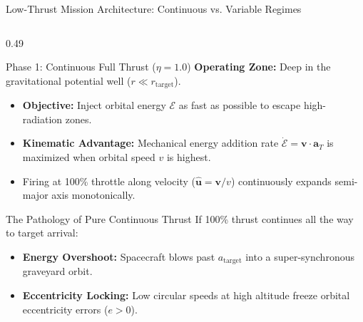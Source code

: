 \documentclass[aspectratio=169, 10pt]{beamer}
\begin{document}
\begin{frame}{Low-Thrust Mission Architecture: Continuous vs. Variable Regimes}
    \begin{columns}[T]
        \begin{column}{0.49\textwidth}
            \begin{block}{Phase 1: Continuous Full Thrust ($\eta = 1.0$)}
                \scriptsize
                \textbf{Operating Zone:} Deep in the gravitational potential well ($r \ll r_{\text{target}}$).
                \begin{itemize}\setlength{\itemsep}{1.5pt}\setlength{\topsep}{1pt}
                    \item \textbf{Objective:} Inject orbital energy $\mathcal{E}$ as fast as possible to escape high-radiation zones.
                    \item \textbf{Kinematic Advantage:} Mechanical energy addition rate $\dot{\mathcal{E}} = \mathbf{v} \cdot \mathbf{a}_T$ is maximized when orbital speed $v$ is highest.
                    \item Firing at 100\% throttle along velocity ($\hat{\mathbf{u}} = \mathbf{v}/v$) continuously expands semi-major axis monotonically.
                \end{itemize}
            \end{block}
            \vspace{-0.15cm}
            \begin{alertblock}{The Pathology of Pure Continuous Thrust}
                \scriptsize
                If 100\% thrust continues all the way to target arrival:
                \begin{itemize}\setlength{\itemsep}{1pt}\setlength{\topsep}{0pt}
                    \item \textbf{Energy Overshoot:} Spacecraft blows past $a_{\text{target}}$ into a super-synchronous graveyard orbit.
                    \item \textbf{Eccentricity Locking:} Low circular speeds at high altitude freeze orbital eccentricity errors ($e > 0$).
                \end{itemize}
            \end{alertblock}
        \end{column}


\end{columns}
\end{frame}
\end{document}
